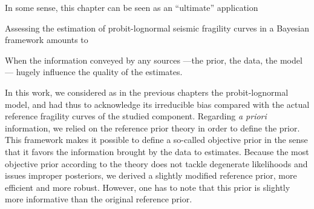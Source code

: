 In some sense, this chapter can be seen as an ``ultimate'' application 





Assessing 
the estimation of probit-lognormal seismic fragility curves in a Bayesian framework
amounts to 


When 
the information conveyed by any sources ---the prior, the data, the model--- hugely influence the quality of the estimates.




In this work, we considered as in the previous chapters the probit-lognormal model, and had thus to acknowledge its irreducible bias compared with the actual reference fragility curves of the studied component.
Regarding \emph{a priori} information, we 
relied on the reference prior theory in order to define the prior. This framework makes it possible to define a so-called objective prior in the sense that it favors the information brought by the data to estimates. Because the
most objective prior according to the theory does not
tackle degenerate likelihoods and issues improper posteriors, we derived a slightly modified reference prior, more efficient and more robust.
However, one has to note that this prior is slightly more informative than the original reference prior.










